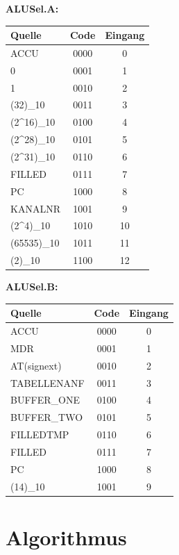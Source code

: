 \textbf{ALUSel.A:}

\begin{tabular}{lcc}
    Quelle               & Code & Eingang \\
    \hline
    ACCU                 & 0000 &  0 \\
    0                    & 0001 &  1 \\
    1                    & 0010 &  2 \\
    (32)_{10}            & 0011 &  3 \\
    (2^{16})_{10}        & 0100 &  4 \\
    (2^{28})_{10}        & 0101 &  5 \\
    (2^{31})_{10}        & 0110 &  6 \\
    FILLED               & 0111 &  7 \\
    PC                   & 1000 &  8 \\
    KANALNR              & 1001 &  9 \\
    (2^4)_{10}           & 1010 & 10 \\
    (65535)_{10}         & 1011 & 11 \\
    (2)_{10}             & 1100 & 12 \\
\end{tabular}

\textbf{ALUSel.B:}

\begin{tabular}{lcc}
    Quelle        & Code & Eingang \\
    \hline
    ACCU          & 0000 &  0 \\
    MDR           & 0001 &  1 \\
    AT(signext)   & 0010 &  2 \\
    TABELLENANF   & 0011 &  3 \\
    BUFFER\_ONE   & 0100 &  4 \\
    BUFFER\_TWO   & 0101 &  5 \\
    FILLEDTMP     & 0110 &  6 \\
    FILLED        & 0111 &  7 \\
    PC            & 1000 &  8 \\
    (14)_{10}     & 1001 &  9 \\
\end{tabular}

\section{Algorithmus}
\label{section:Dokumentation-Implementierung-Algorithmus}

